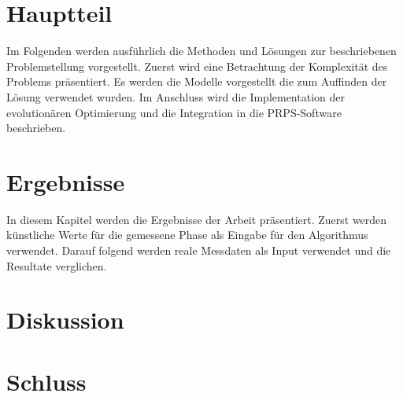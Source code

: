 \documentclass[a4paper,12pt, twoside, openright]{scrbook}
\begin{document}

%

\chapter{Hauptteil}
Im Folgenden werden ausführlich die Methoden und Lösungen zur beschriebenen Problemstellung vorgestellt. Zuerst wird eine Betrachtung der Komplexität des Problems präsentiert. Es werden die Modelle vorgestellt die zum Auffinden der Lösung verwendet wurden. Im Anschluss wird die Implementation der evolutionären Optimierung und die Integration in die PRPS-Software beschrieben.
%

%
\chapter{Ergebnisse}
In diesem Kapitel werden die Ergebnisse der Arbeit präsentiert. Zuerst werden künstliche Werte für die gemessene Phase als Eingabe für den Algorithmus verwendet. Darauf folgend werden reale Messdaten als Input verwendet und die Resultate verglichen.\\
%

%
\chapter{Diskussion}
%

%
\chapter{Schluss}

%


\newpage
%




\end{document}
